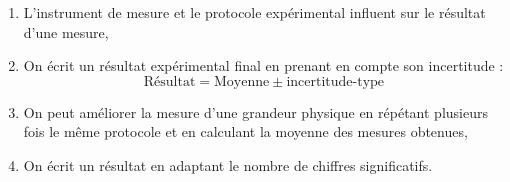 \begin{tcolorbox}[colback=red!5!white,colframe=red!75!black,title=\textbf{On retiendra : }]
\begin{enumerate}
    \item L'instrument de mesure et le protocole expérimental influent sur le résultat d'une mesure,
    \item On écrit un résultat expérimental final en prenant en compte son incertitude :
    \begin{equation*}
        \text{Résultat} = \text{Moyenne} \pm \text{incertitude-type}
    \end{equation*}
    \item On peut améliorer la mesure d'une grandeur physique en répétant plusieurs fois le même protocole et en calculant la moyenne des mesures obtenues,
    \item On écrit un résultat en adaptant le nombre de chiffres significatifs.
\end{enumerate}
\end{tcolorbox}
